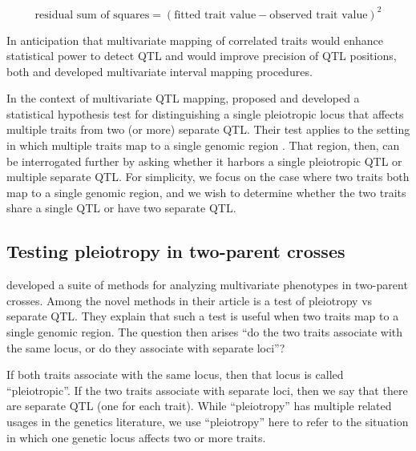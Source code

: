 \documentclass[oneside]{book}\usepackage[]{graphicx}\usepackage[]{color}
\begin{document}
\begin{equation}
\text{residual sum of squares} = \left(\text{fitted trait value} - \text{observed trait value}\right)^2\label{eq:rss}
\end{equation}




In anticipation that multivariate mapping of correlated traits would enhance statistical
power to detect QTL and would improve precision of QTL positions,
both \citet{jiang1995multiple} and \citet{korol1995interval} developed
multivariate interval mapping procedures. 





In the context of multivariate QTL mapping, \citet{jiang1995multiple} 
proposed and developed a statistical hypothesis test for distinguishing
a single pleiotropic locus that affects multiple traits from two (or more)
separate QTL.
Their test applies to the setting in which multiple traits
map to a single genomic region \citep{jiang1995multiple}. 
That region, then, can be interrogated further by asking whether it
harbors a single pleiotropic QTL or multiple separate QTL. 
For simplicity, we focus on the case where two traits both map to a single genomic region,
and we wish to determine whether the two traits share a single QTL or have two separate QTL. 

\subsection{Testing pleiotropy in two-parent crosses}

\citet{jiang1995multiple} developed a suite of methods for analyzing multivariate phenotypes in
two-parent crosses.
Among the novel methods in their article is a test of pleiotropy vs separate QTL.
They explain that such a test is useful when two traits map to a single genomic region.
The question then arises ``do the two traits associate with the same locus, or do they associate with separate loci''?

If both traits associate with the same locus, then that locus is called ``pleiotropic''. If the two traits associate with separate loci, then we say that there are separate QTL (one for each trait). While ``pleiotropy'' has multiple related usages in the genetics literature, we use ``pleiotropy'' here to refer to the situation in which one genetic locus affects two or more traits. 
\end{document}
